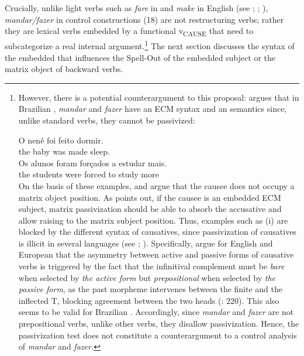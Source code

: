 \documentclass[output=paper]{langsci/langscibook}
\begin{document}
Crucially, unlike light verbs such as \textit{fare} in  and \textit{make} in English (see \citealt{Guasti1996}; \citealt{Folli2007}; \citealt{Pylkkänen2002,Pylkkänen2008}), \textit{mandar\slash fazer} in control constructions (18) are not restructuring verbs; rather they are lexical verbs embedded by a functional v\textsubscript{CAUSE}  that need to subcategorize a real internal argument.\footnote{However, there is a potential counterargument to this proposal: \citet{Farrell1995} argues that in Brazilian , \textit{mandar} and \textit{fazer} have an ECM syntax and an  semantics since, unlike standard  verbs, they cannot be passivized:

\ea\gll * O nenê   foi feito    dormir.\\
          {}  the baby  was made  sleep.\\
\z
\ea\gll {} Os alunos  foram forçados  a  estudar  mais.\\
         {}  the students were  forced to study  more\\
\z
On the basis of these examples, \citet{Farrell1995} and \citet{Hornstein2003} argue that the causee does not occupy a matrix object position. As \citet{Landau2004} points out, if the causee is an embedded ECM subject, matrix passivization should be able to absorb the accusative and allow raising to the matrix subject position.   Thus, examples such as (i) are blocked by the different syntax of causatives, since passivization of causatives is illicit in several languages (see \citealt{Landau2004}; \citealt{Hornstein2008}). Specifically, \citet{Hornstein2008} argue for English and European  that the asymmetry between active and passive forms of causative verbs is triggered by the fact that the infinitival complement must be \textit{bare} when selected by \textit{the active form} but \textit{prepositional} when selected by \textit{the passive form}, as the past  morpheme intervenes between the finite and the inflected T, blocking agreement between the two heads (\citealt{Hornstein2008}: 220).  This also seems to be valid for Brazilian . Accordingly, since \textit{mandar} and \textit{fazer} are not prepositional verbs, unlike other  verbs, they disallow passivization. Hence, the passivization test does not constitute a counterargument to a control analysis of \textit{mandar} and \textit{fazer.}} The next section discusses the syntax of the embedded  that influences the Spell-Out of the embedded subject or the matrix object of backward  verbs. 
\end{document}
